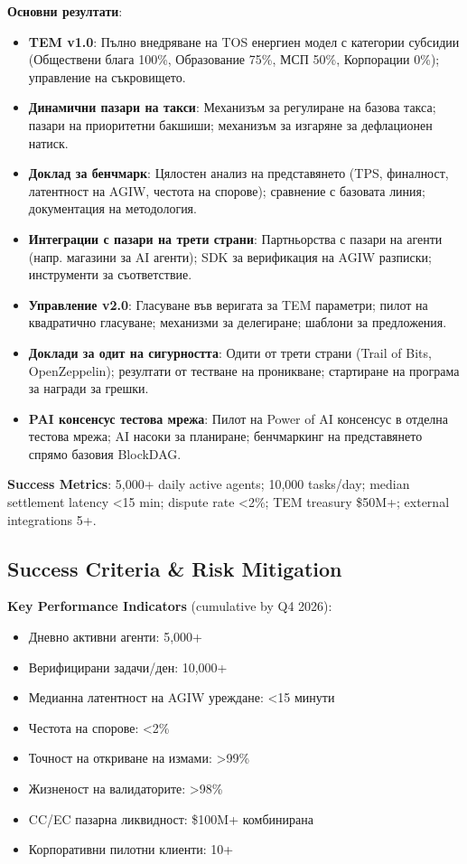 \documentclass[11pt]{article}
\begin{document}
\textbf{Основни резултати}:
\begin{itemize}[noitemsep]
  \item \textbf{TEM v1.0}: Пълно внедряване на TOS енергиен модел с категории субсидии (Обществени блага 100\%, Образование 75\%, МСП 50\%, Корпорации 0\%); управление на съкровището.
  \item \textbf{Динамични пазари на такси}: Механизъм за регулиране на базова такса; пазари на приоритетни бакшиши; механизъм за изгаряне за дефлационен натиск.
  \item \textbf{Доклад за бенчмарк}: Цялостен анализ на представянето (TPS, финалност, латентност на AGIW, честота на спорове); сравнение с базовата линия; документация на методология.
  \item \textbf{Интеграции с пазари на трети страни}: Партньорства с пазари на агенти (напр. магазини за AI агенти); SDK за верификация на AGIW разписки; инструменти за съответствие.
  \item \textbf{Управление v2.0}: Гласуване във веригата за TEM параметри; пилот на квадратично гласуване; механизми за делегиране; шаблони за предложения.
  \item \textbf{Доклади за одит на сигурността}: Одити от трети страни (Trail of Bits, OpenZeppelin); резултати от тестване на проникване; стартиране на програма за награди за грешки.
  \item \textbf{PAI консенсус тестова мрежа}: Пилот на Power of AI консенсус в отделна тестова мрежа; AI насоки за планиране; бенчмаркинг на представянето спрямо базовия BlockDAG.
\end{itemize}

\textbf{Success Metrics}: 5,000+ daily active agents; 10,000 tasks/day; median settlement latency <15 min; dispute rate <2\%; TEM treasury \$50M+; external integrations 5+.

\subsection{Success Criteria \& Risk Mitigation}

\textbf{Key Performance Indicators} (cumulative by Q4 2026):
\begin{itemize}[noitemsep]
  \item Дневно активни агенти: 5,000+
  \item Верифицирани задачи/ден: 10,000+
  \item Медианна латентност на AGIW уреждане: <15 минути
  \item Честота на спорове: <2\%
  \item Точност на откриване на измами: >99\%
  \item Жизненост на валидаторите: >98\%
  \item CC/EC пазарна ликвидност: \$100M+ комбинирана
  \item Корпоративни пилотни клиенти: 10+
\end{itemize}
\end{document}
